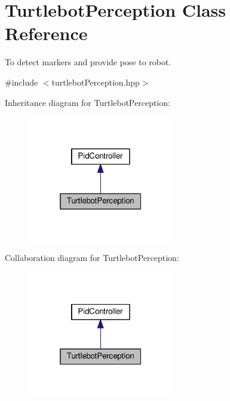 \hypertarget{classTurtlebotPerception}{}\section{Turtlebot\+Perception Class Reference}
\label{classTurtlebotPerception}


To detect markers and provide pose to robot.  




{\ttfamily \#include $<$turtlebot\+Perception.\+hpp$>$}



Inheritance diagram for Turtlebot\+Perception\+:\nopagebreak
\begin{figure}[H]
\begin{center}
\leavevmode
\includegraphics[width=181pt]{classTurtlebotPerception__inherit__graph}
\end{center}
\end{figure}


Collaboration diagram for Turtlebot\+Perception\+:\nopagebreak
\begin{figure}[H]
\begin{center}
\leavevmode
\includegraphics[width=181pt]{classTurtlebotPerception__coll__graph}
\end{center}
\end{figure}
